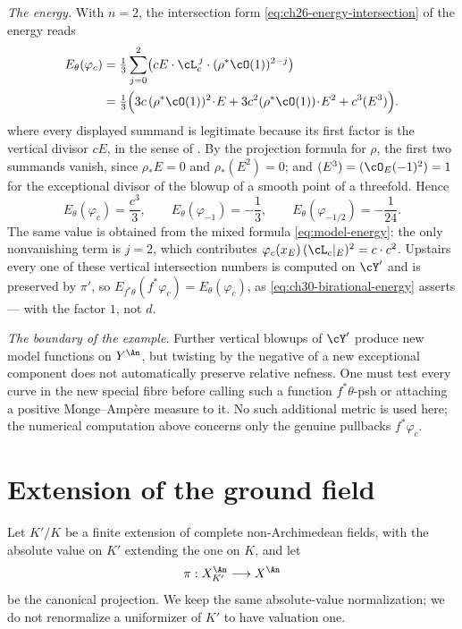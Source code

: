 \begin{example}
\emph{The energy.}  With $n=2$, the intersection form
\eqref{eq:ch26-energy-intersection} of the energy reads
\[
\begin{aligned}
 E_\theta(\varphi_c)
 & =\tfrac13\sum_{j=0}^2
   \bigl(cE\cdot\cL_c^{\,j}\cdot(\rho^*\cO(1))^{2-j}\bigr)\\
 & =\tfrac13\Bigl(
   3c\,(\rho^*\cO(1))^2\!\cdot\!E
   +3c^2(\rho^*\cO(1))\!\cdot\!E^2
   +c^3(E^3)\Bigr).
\end{aligned}
\]
where every displayed summand is legitimate because its first factor is the
vertical divisor $cE$, in the sense of
.  By the projection formula for $\rho$, the first two summands
vanish, since $\rho_*E=0$ and $\rho_*(E^2)=0$; and $(E^3)=(\cO_E(-1)^2)
=1$ for the exceptional divisor of the blowup of a smooth point of a
threefold.  Hence
\begin{equation}
\label{eq:ch30-surface-energy}
 E_\theta(\varphi_c)=\frac{c^3}{3},
 \qquad
 E_\theta(\varphi_{-1})=-\frac13,
 \qquad
 E_\theta(\varphi_{-1/2})=-\frac1{24} .
\end{equation}
The same value is obtained from the mixed formula
\eqref{eq:model-energy}: the only nonvanishing term is $j=2$, which
contributes $\varphi_c(x_E)\,(\cL_c|_E)^2=c\cdot c^2$.  Upstairs every one
of these vertical intersection numbers is computed on $\cY'$ and is
preserved by $\pi'$, so
$E_{f^*\theta}(f^*\varphi_c)=E_\theta(\varphi_c)$, as
\eqref{eq:ch30-birational-energy} asserts --- with the factor $1$, not
$d$.

\emph{The boundary of the example.}  Further vertical blowups of $\cY'$
produce new model functions on $Y^{\An}$, but twisting by the negative of
a new exceptional component does not automatically preserve relative
nefness.  One must test every curve in the new special fibre before calling
such a function $f^*\theta$-psh or attaching a positive
Monge--Amp\`ere measure to it.  No such additional metric is used here; the
numerical computation above concerns only the genuine pullbacks
$f^*\varphi_c$.
\end{example}

\section{Extension of the ground field}
\label{sec:ch30-base-change}

Let $K'/K$ be a finite extension of complete non-Archimedean fields, with
the absolute value on $K'$ extending the one on $K$, and let
\begin{equation}
\label{eq:ch30-base-change-map}
               \pi:X_{K'}^{\An}\longrightarrow X^{\An}
\end{equation}
be the canonical projection.  We keep the same absolute-value
normalization; we do not renormalize a uniformizer of $K'$ to have
valuation one.

